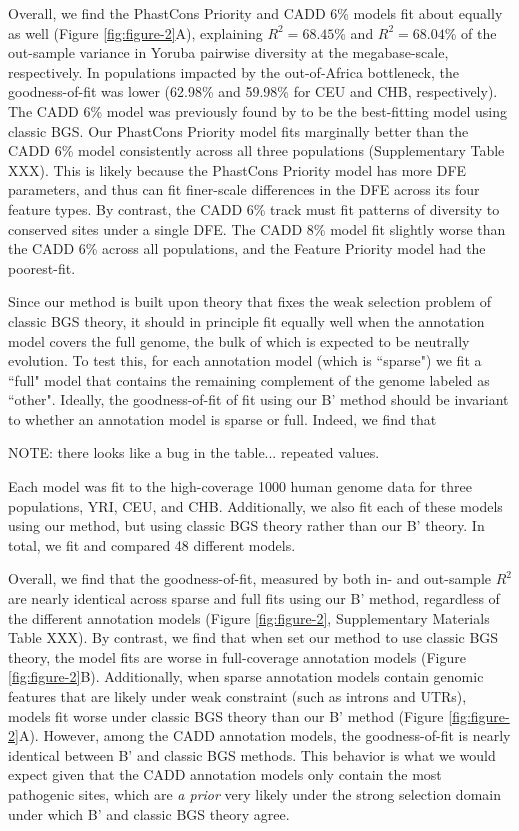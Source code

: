 \documentclass[11pt]{article}
\begin{document}
Overall, we find the PhastCons Priority and CADD 6\% models fit about equally
as well (Figure \ref{fig:figure-2}A), explaining $R^2=68.45$\% and
$R^2=68.04$\% of the out-sample variance in Yoruba pairwise diversity at the
megabase-scale, respectively. In populations impacted by the out-of-Africa
bottleneck, the goodness-of-fit was lower (62.98\% and 59.98\% for CEU and CHB,
respectively). The CADD 6\% model was previously found by
\textcite{Murphy2022-sj} to be the best-fitting model using classic BGS. Our
PhastCons Priority model fits marginally better than the CADD 6\% model
consistently across all three populations (Supplementary Table XXX). This is
likely because the PhastCons Priority model has more DFE parameters, and thus
can fit finer-scale differences in the DFE across its four feature types. By
contrast, the CADD 6\% track must fit patterns of diversity to conserved sites
under a single DFE. The CADD 8\% model fit slightly worse than the CADD 6\%
across all populations, and the Feature Priority model had the poorest-fit.

Since our method is built upon theory that fixes the weak selection problem of
classic BGS theory, it should in principle fit equally well when the annotation
model covers the full genome, the bulk of which is expected to be neutrally
evolution. To test this, for each annotation model (which is ``sparse") we fit
a ``full" model that contains the remaining complement of the genome labeled as
``other". Ideally, the goodness-of-fit of fit using our B' method should be
invariant to whether an annotation model is sparse or full. Indeed, we find
that 

NOTE: there looks like a bug in the table... repeated values.


Each model was fit to the high-coverage 1000 human genome data for
three populations, YRI, CEU, and CHB. Additionally, we also fit each of these
models using our method, but using classic BGS theory rather than our B'
theory. In total, we fit and compared 48 different models.

Overall, we find that the goodness-of-fit, measured by both in- and out-sample
$R^2$ are nearly identical across sparse and full fits using our B' method,
regardless of the different annotation models (Figure \ref{fig:figure-2},
Supplementary Materials Table XXX). By contrast, we find that when set our
method to use classic BGS theory, the model fits are worse in full-coverage
annotation models (Figure \ref{fig:figure-2}B). Additionally, when sparse
annotation models contain genomic features that are likely under weak
constraint (such as introns and UTRs), models fit worse under classic BGS
theory than our B' method (Figure \ref{fig:figure-2}A). However, among the CADD
annotation models, the goodness-of-fit is nearly identical between B' and
classic BGS methods. This behavior is what we would expect given that the CADD
annotation models only contain the most pathogenic sites, which are \emph{a
prior} very likely under the strong selection domain under which B' and classic
BGS theory agree.
\end{document}
